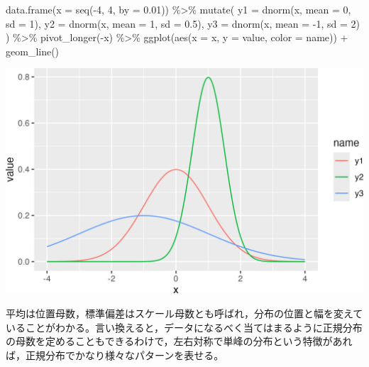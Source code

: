 \documentclass[
  a4paper,
]{ltjsbook}
\newenvironment{Shaded}{\begin{snugshade}}{\end{snugshade}}
\newcommand{\AttributeTok}[1]{\textcolor[rgb]{0.40,0.45,0.13}{#1}}
\newcommand{\DecValTok}[1]{\textcolor[rgb]{0.68,0.00,0.00}{#1}}
\newcommand{\FloatTok}[1]{\textcolor[rgb]{0.68,0.00,0.00}{#1}}
\newcommand{\FunctionTok}[1]{\textcolor[rgb]{0.28,0.35,0.67}{#1}}
\newcommand{\NormalTok}[1]{\textcolor[rgb]{0.00,0.23,0.31}{#1}}
\newcommand{\SpecialCharTok}[1]{\textcolor[rgb]{0.37,0.37,0.37}{#1}}
\begin{document}
\begin{Shaded}
\begin{Highlighting}[]
\FunctionTok{data.frame}\NormalTok{(}\AttributeTok{x =} \FunctionTok{seq}\NormalTok{(}\SpecialCharTok{{-}}\DecValTok{4}\NormalTok{, }\DecValTok{4}\NormalTok{, }\AttributeTok{by =} \FloatTok{0.01}\NormalTok{)) }\SpecialCharTok{\%\textgreater{}\%}
  \FunctionTok{mutate}\NormalTok{(}
    \AttributeTok{y1 =} \FunctionTok{dnorm}\NormalTok{(x, }\AttributeTok{mean =} \DecValTok{0}\NormalTok{, }\AttributeTok{sd =} \DecValTok{1}\NormalTok{),}
    \AttributeTok{y2 =} \FunctionTok{dnorm}\NormalTok{(x, }\AttributeTok{mean =} \DecValTok{1}\NormalTok{, }\AttributeTok{sd =} \FloatTok{0.5}\NormalTok{),}
    \AttributeTok{y3 =} \FunctionTok{dnorm}\NormalTok{(x, }\AttributeTok{mean =} \SpecialCharTok{{-}}\DecValTok{1}\NormalTok{, }\AttributeTok{sd =} \DecValTok{2}\NormalTok{)}
\NormalTok{  ) }\SpecialCharTok{\%\textgreater{}\%}
  \FunctionTok{pivot\_longer}\NormalTok{(}\SpecialCharTok{{-}}\NormalTok{x) }\SpecialCharTok{\%\textgreater{}\%}
  \FunctionTok{ggplot}\NormalTok{(}\FunctionTok{aes}\NormalTok{(}\AttributeTok{x =}\NormalTok{ x, }\AttributeTok{y =}\NormalTok{ value, }\AttributeTok{color =}\NormalTok{ name)) }\SpecialCharTok{+}
  \FunctionTok{geom\_line}\NormalTok{()}
\end{Highlighting}
\end{Shaded}

\includegraphics{chapter06_files/figure-pdf/normals-1.png}

平均は位置母数，標準偏差はスケール母数とも呼ばれ，分布の位置と幅を変えていることがわかる。言い換えると，データになるべく当てはまるように正規分布の母数を定めることもできるわけで，左右対称で単峰の分布という特徴があれば，正規分布でかなり様々なパターンを表せる。
\end{document}
